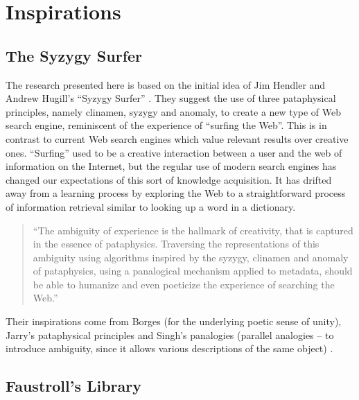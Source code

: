 
\chapter{Inspirations}
\label{ch:inspiro}

\startcontents[chapters]
\minicontents

\brule %


\section{The Syzygy Surfer}

The research presented here is based on the initial idea of Jim Hendler and Andrew Hugill's ``Syzygy Surfer'' \autocite{Hendler2011, Hendler2013}. They suggest the use of three pataphysical principles, namely clinamen, syzygy and anomaly, to create a new type of Web search engine, reminiscent of the experience of ``surfing the Web''. This is in contrast to current Web search engines which value relevant results over creative ones.  ``Surfing'' used to be a creative interaction between a user and the web of information on the Internet, but the regular use of modern search engines has changed our expectations of this sort of knowledge acquisition. It has drifted away from a learning process by exploring the Web to a straightforward process of information retrieval similar to looking up a word in a dictionary.

\begin{quote}
  ``The ambiguity of experience is the hallmark of creativity, that is captured in the essence of pataphysics. Traversing the representations of this ambiguity using algorithms inspired by the syzygy, clinamen and anomaly of pataphysics, using a panalogical mechanism applied to metadata, should be able to humanize and even poeticize the experience of searching the Web.''\autocite{Hendler2013}
\end{quote}

Their inspirations come from Borges \autocite{Borges2000} (for the underlying poetic sense of unity), Jarry's pataphysical principles \autocite{Jarry1996} and Singh's panalogies (parallel analogies – to introduce ambiguity, since it allows various descriptions of the same object) \autocite{Singh2005}.


\section{Faustroll's Library}

